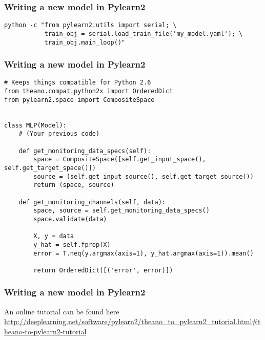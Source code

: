 \documentclass[mathserif, xcolor=dvipsnames]{beamer}
\begin{document}
\begin{frame}[fragile]
    \frametitle{Writing a new model in Pylearn2}
    \begin{examples}
\begin{lstlisting}[caption=Train the model]
python -c "from pylearn2.utils import serial; \
           train_obj = serial.load_train_file('my_model.yaml'); \
           train_obj.main_loop()"
\end{lstlisting}
    \end{examples}
\end{frame}

\begin{frame}[fragile]
    \frametitle{Writing a new model in Pylearn2}
    \begin{examples}
\begin{lstlisting}[caption=Bonus! Monitoring]
# Keeps things compatible for Python 2.6
from theano.compat.python2x import OrderedDict
from pylearn2.space import CompositeSpace


class MLP(Model):
    # (Your previous code)

    def get_monitoring_data_specs(self):
        space = CompositeSpace([self.get_input_space(), self.get_target_space()])
        source = (self.get_input_source(), self.get_target_source())
        return (space, source)

    def get_monitoring_channels(self, data):
        space, source = self.get_monitoring_data_specs()
        space.validate(data)

        X, y = data
        y_hat = self.fprop(X)
        error = T.neq(y.argmax(axis=1), y_hat.argmax(axis=1)).mean()

        return OrderedDict([('error', error)])
\end{lstlisting}
    \end{examples}
\end{frame}

\begin{frame}[fragile]
    \frametitle{Writing a new model in Pylearn2}

    \begin{alertblock}{An online tutorial can be found here}
        \url{http://deeplearning.net/software/pylearn2/theano_to_pylearn2_tutorial.html#theano-to-pylearn2-tutorial}
    \end{alertblock}
\end{frame}
\end{document}
